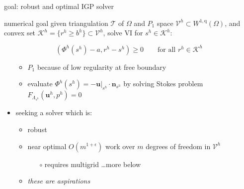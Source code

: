 \documentclass[usepdftitle=false,usenames,dvipsnames]{beamer}
\newcommand{\eps}{\epsilon}
\newcommand{\bn}{\mathbf{n}}
\newcommand{\bu}{\mathbf{u}}
\newcommand{\ip}[2]{\left(#1,#2\right)}
\newcommand{\qq}{{\text{q}}}
\begin{document}
\begin{frame}{goal: robust and optimal IGP solver}

\begin{block}{numerical goal}
given triangulation $\mathcal{T}$ of $\Omega$ and $P_1$ space $\mathcal{V}^h \subset W^{1,\qq}(\Omega)$, and convex set $\mathcal{K}^h = \{r^h \ge b^h\} \subset \mathcal{V}^h$, solve VI for $s^h \in \mathcal{K}^h$:

$$\ip{\Phi^h(s^h) - a}{r^h - s^h} \ge 0 \qquad \text{for all $r^h \in \mathcal{K}^h$}$$
\end{block}

\begin{itemize}
\item[]
    \begin{itemize}
    \item $P_1$ because of low regularity at free boundary
    \item evaluate $\Phi^h(s^h)=-\bu|_{s^h}\cdot\bn_{s^h}$ by solving Stokes problem $F_{\Lambda_{s^h}}(\bu^h,p^h)=0$
    \end{itemize}
\item seeking a solver which is:
    \begin{itemize}
    \item \alert{robust}
    \item \alert{near optimal} $O(m^{1+\eps})$ work over $m$ degrees of freedom in $\mathcal{V}^h$
        \begin{itemize}
        \item[{\color{black} $\circ$}] requires multigrid \dots more below
        \end{itemize}
    \item \emph{these are aspirations}
    \end{itemize}
\end{itemize}
\end{frame}
\end{document}

